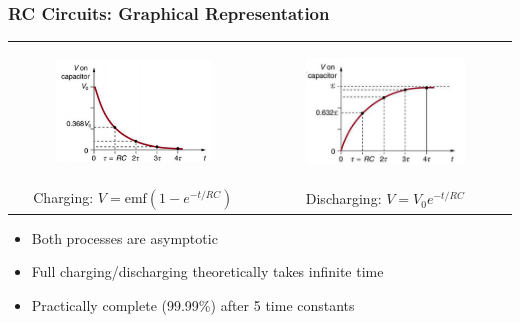\documentclass{beamer}
\begin{document}
\begin{frame}
    \frametitle{RC Circuits: Graphical Representation}
    \begin{center}
        \begin{tabular}{cc}
            \begin{figure}
    \centering
    \includegraphics[width=0.5\linewidth]{dischcurve.png}
\end{figure} 
&
\begin{figure}
                \centering
                \includegraphics[width=0.4\linewidth]{charge.png}
            \end{figure} \\


                        Charging: $V = \text{emf}(1-e^{-t/RC})$ & Discharging: $V = V_0e^{-t/RC}$
        \end{tabular}
    \end{center}
    \begin{itemize}
        \item Both processes are asymptotic
        \item Full charging/discharging theoretically takes infinite time
        \item Practically complete (99.99\%) after 5 time constants
    \end{itemize}
\end{frame}

\end{document}
